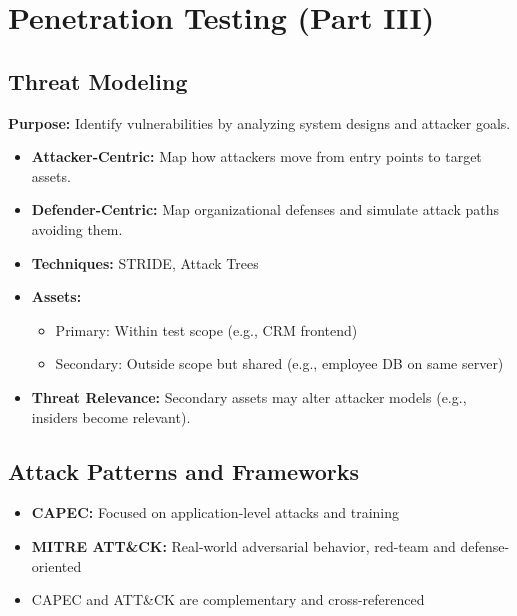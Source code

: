 \section{Penetration Testing (Part III)}
\subsection{Threat Modeling}
{
\textbf{Purpose:} Identify vulnerabilities by analyzing system designs and attacker goals.

\begin{itemize}[noitemsep]
  \item \textbf{Attacker-Centric:} Map how attackers move from entry points to target assets.
  \item \textbf{Defender-Centric:} Map organizational defenses and simulate attack paths avoiding them.
  \item \textbf{Techniques:} STRIDE, Attack Trees
  \item \textbf{Assets:}
    \begin{itemize}
      \item Primary: Within test scope (e.g., CRM frontend)
      \item Secondary: Outside scope but shared (e.g., employee DB on same server)
    \end{itemize}
  \item \textbf{Threat Relevance:} Secondary assets may alter attacker models (e.g., insiders become relevant).
\end{itemize}
}
\subsection{Attack Patterns and Frameworks}{
\begin{itemize}[noitemsep]
  \item \textbf{CAPEC:} Focused on application-level attacks and training
  \item \textbf{MITRE ATT\&CK:} Real-world adversarial behavior, red-team and defense-oriented
  \item CAPEC and ATT\&CK are complementary and cross-referenced
\end{itemize}
}
